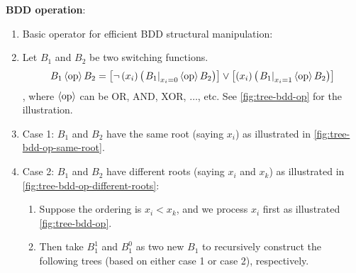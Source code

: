 \documentclass[../src/handouts/main.tex]{subfiles}
\begin{document}
\textbf{BDD operation}:
\begin{enumerate}
  \item Basic operator for efficient BDD structural manipulation:

  \item Let $B_1$ and $B_2$ be two switching functions.
    \[
      B_1 \operatorname{\langle\text{op}\rangle} B_2 =
      \left[ \neg \left( x_i \right) \left(\left. B_1 \right|_{x_i = 0} \operatorname{\langle\text{op}\rangle} B_2 \right) \right] \lor
      \left[ \left( x_i \right) \left( \left. B_1 \right|_{x_i = 1} \operatorname{\langle\text{op}\rangle} B_2 \right) \right]
    \]
    , where $\operatorname{\langle\text{op}\rangle}$ can be OR, AND, XOR, $\ldots$, etc. See \cref{fig:tree-bdd-op} for the illustration.

  \item Case 1: $B_1$ and $B_2$ have the same root (saying $x_i$) as illustrated in \cref{fig:tree-bdd-op-same-root}.

  \item Case 2: $B_1$ and $B_2$ have different roots (saying $x_i$ and $x_k$) as illustrated in \cref{fig:tree-bdd-op-different-roots}:
    \begin{enumerate}
      \item Suppose the ordering is $x_i < x_k$, and we process $x_i$ first as illustrated \cref{fig:tree-bdd-op}.
      \item Then take $B_1^1$ and $B_1^0$ as two new $B_1$ to recursively construct the following trees (based on either case 1 or case 2), respectively.
    \end{enumerate}
\end{enumerate}
\end{document}

